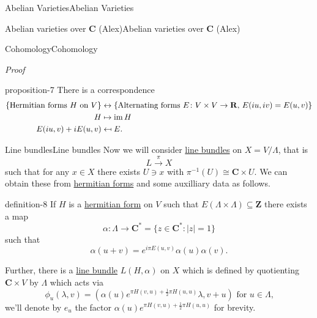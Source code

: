 \documentclass[10pt,]{book}
\makeatletter
\renewcommand*{\proofname}{Proof}
\renewenvironment{proof}[1][\proofname]{\par
  \pushQED{\qed}%
  \normalfont \topsep6\p@\@plus6\p@\relax
  \trivlist
  \item\relax
    {\itshape
    #1\@addpunct{.}}\hspace\labelsep\ignorespaces
}{%
  \popQED\endtrivlist\@endpefalse
}
\numberwithin{equation}{section}
\providecommand\mapsfrom{\mathrel{\reflectbox{\ensuremath{\mapsto}}}}
\newcommand{\ZZ}{\mathbf{Z}}
\newcommand{\RR}{\mathbf{R}}
\newcommand{\CC}{\mathbf{C}}
\DeclareMathOperator{\im}{im}
\newcommand{\amp}{&}
\makeatother
\begin{document}
\begin{chapterptx}{Abelian Varieties}{}{Abelian Varieties}{}{}
\begin{sectionptx}{Abelian varieties over \(\CC\) (Alex)}{}{Abelian varieties over \(\CC\) (Alex)}{}{}
\begin{subsectionptx}{Cohomology}{}{Cohomology}{}{}
\begin{proof}
\end{proof}
\begin{proposition}{}{}{proposition-7}%
\hypertarget{p-56}{}%
There is a correspondence%
\begin{align*}
\{\text{Hermitian forms }H \text{ on } V\} \amp\leftrightarrow\{\text{Alternating forms }E\colon V\times V\to\RR,\,E(iu,iv) = E(u,v)\}\\
H\amp\mapsto \im H\\
E(iu,v)+ i E(u,v) \amp\mapsfrom E\text{.}
\end{align*}
%
\end{proposition}
\end{subsectionptx}
%
%
\typeout{************************************************}
\typeout{************************************************}
%
\begin{subsectionptx}{Line bundles}{}{Line bundles}{}{}\label{subsection-6}
\hypertarget{p-57}{}%
Now we will consider \hyperref[def-line-bundle]{line bundles} on \(X = V/\Lambda\), that is%
\begin{equation*}
L\xrightarrow{\pi} X
\end{equation*}
such that for any \(x\in X\) there exists \(U\ni x\) with \(\pi^{-1} (U) \cong \CC \times U\). We can obtain these from \hyperref[sec-buntes-av-jac]{hermitian forms} and some auxilliary data as follows.%
\begin{definition}{}{definition-8}%
\hypertarget{p-58}{}%
If \(H\) is a \hyperref[sec-buntes-av-jac]{hermitian form} on \(V\) such that \(E(\Lambda\times\Lambda) \subseteq \ZZ\) there exists a map%
\begin{equation*}
\alpha \colon \Lambda \to \CC^*  = \{z\in \CC^* : |z| = 1\}
\end{equation*}
such that%
\begin{equation*}
\alpha(u + v) = e^{i\pi E(u,v)} \alpha(u) \alpha(v)\text{.}
\end{equation*}
%
\par
\hypertarget{p-59}{}%
Further, there is a \hyperref[def-line-bundle]{line bundle} \(L(H, \alpha)\) on \(X\) which is defined by quotienting \(\CC\times V\) by \(\Lambda\) which acts via%
\begin{equation*}
\phi_u(\lambda, v) = (\alpha(u)e^{\pi H(v,u) + \frac12 \pi H(u,u)}\lambda, v+u)\text{ for } u\in \Lambda\text{,}
\end{equation*}
we'll denote by \(e_u\) the factor \(\alpha(u)e^{\pi H(v,u) + \frac12 \pi H(u,u)}\) for brevity.%
\end{definition}

\end{subsectionptx}
\end{sectionptx}
\end{chapterptx}
\end{document}
